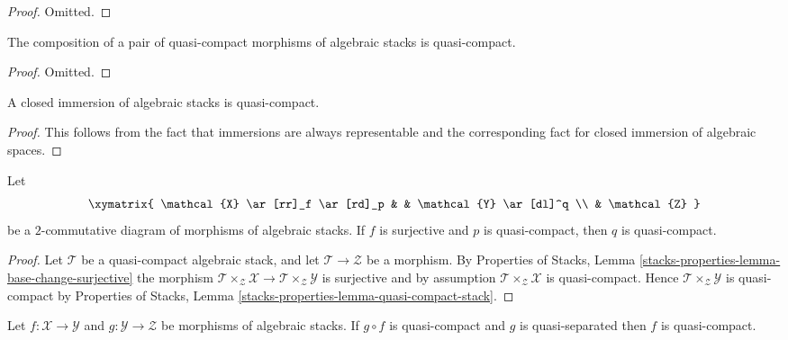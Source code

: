 \begin{proof}
Omitted.
\end{proof}

\begin{lemma}
\label{lemma-composition-quasi-compact}
The composition of a pair of quasi-compact morphisms of algebraic stacks
is quasi-compact.
\end{lemma}

\begin{proof}
Omitted.
\end{proof}

\begin{lemma}
\label{lemma-closed-immersion-quasi-compact}
A closed immersion of algebraic stacks is quasi-compact.
\end{lemma}

\begin{proof}
This follows from the fact that immersions are always representable and
the corresponding fact for closed immersion of algebraic spaces.
\end{proof}

\begin{lemma}
\label{lemma-surjection-from-quasi-compact}
Let
$$
\xymatrix{
\mathcal{X} \ar[rr]_f \ar[rd]_p & &
\mathcal{Y} \ar[dl]^q \\
& \mathcal{Z}
}
$$
be a $2$-commutative diagram of morphisms of algebraic stacks.
If $f$ is surjective and $p$ is quasi-compact, then $q$ is quasi-compact.
\end{lemma}

\begin{proof}
Let $\mathcal{T}$ be a quasi-compact algebraic stack, and let
$\mathcal{T} \to \mathcal{Z}$ be a morphism. By
Properties of Stacks,
Lemma \ref{stacks-properties-lemma-base-change-surjective}
the morphism
$\mathcal{T} \times_\mathcal{Z} \mathcal{X} \to
\mathcal{T} \times_\mathcal{Z} \mathcal{Y}$
is surjective and by assumption
$\mathcal{T} \times_\mathcal{Z} \mathcal{X}$
is quasi-compact. Hence
$\mathcal{T} \times_\mathcal{Z} \mathcal{Y}$
is quasi-compact by
Properties of Stacks, Lemma \ref{stacks-properties-lemma-quasi-compact-stack}.
\end{proof}

\begin{lemma}
\label{lemma-quasi-compact-permanence}
Let $f : \mathcal{X} \to \mathcal{Y}$ and
$g : \mathcal{Y} \to \mathcal{Z}$ be morphisms of algebraic stacks.
If $g \circ f$ is quasi-compact and $g$ is quasi-separated
then $f$ is quasi-compact.
\end{lemma}

